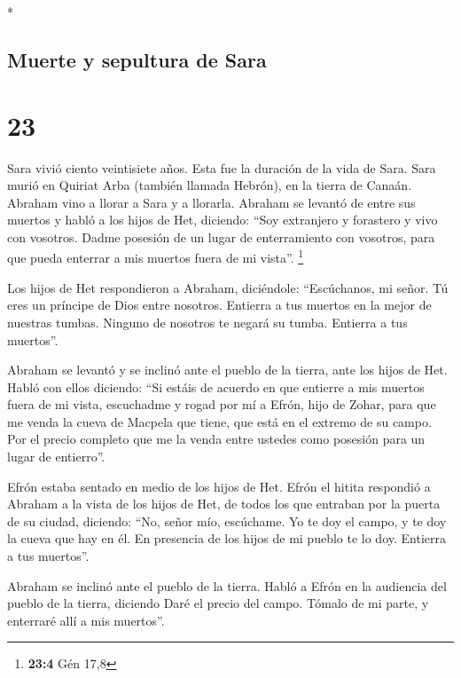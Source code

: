 \begin{paracol}{2}
\begin{otherlanguage}{english}
\end{otherlanguage}

\switchcolumn[0]*

\hypertarget{muerte-y-sepultura-de-sara}{%
\subsection{Muerte y sepultura de
Sara}\label{muerte-y-sepultura-de-sara}}

\hypertarget{section-44}{%
\section{23}\label{section-44}}

 Sara vivió ciento veintisiete años. Esta fue la duración
de la vida de Sara.  Sara murió en Quiriat Arba (también
llamada Hebrón), en la tierra de Canaán. Abraham vino a llorar a Sara y
a llorarla.  Abraham se levantó de entre sus muertos y
habló a los hijos de Het, diciendo:  ``Soy extranjero y
forastero y vivo con vosotros. Dadme posesión de un lugar de
enterramiento con vosotros, para que pueda enterrar a mis muertos fuera
de mi vista''. \footnote{\textbf{23:4} Gén 17,8}

 Los hijos de Het respondieron a Abraham, diciéndole:
 ``Escúchanos, mi señor. Tú eres un príncipe de Dios entre
nosotros. Entierra a tus muertos en la mejor de nuestras tumbas. Ninguno
de nosotros te negará su tumba. Entierra a tus muertos''.

 Abraham se levantó y se inclinó ante el pueblo de la
tierra, ante los hijos de Het.  Habló con ellos diciendo:
``Si estáis de acuerdo en que entierre a mis muertos fuera de mi vista,
escuchadme y rogad por mí a Efrón, hijo de Zohar,  para
que me venda la cueva de Macpela que tiene, que está en el extremo de su
campo. Por el precio completo que me la venda entre ustedes como
posesión para un lugar de entierro''.

 Efrón estaba sentado en medio de los hijos de Het. Efrón
el hitita respondió a Abraham a la vista de los hijos de Het, de todos
los que entraban por la puerta de su ciudad, diciendo: 
``No, señor mío, escúchame. Yo te doy el campo, y te doy la cueva que
hay en él. En presencia de los hijos de mi pueblo te lo doy. Entierra a
tus muertos''.

 Abraham se inclinó ante el pueblo de la tierra.
 Habló a Efrón en la audiencia del pueblo de la tierra,
diciendo Daré el precio del campo. Tómalo de mi parte, y enterraré allí
a mis muertos''.


\end{paracol}
